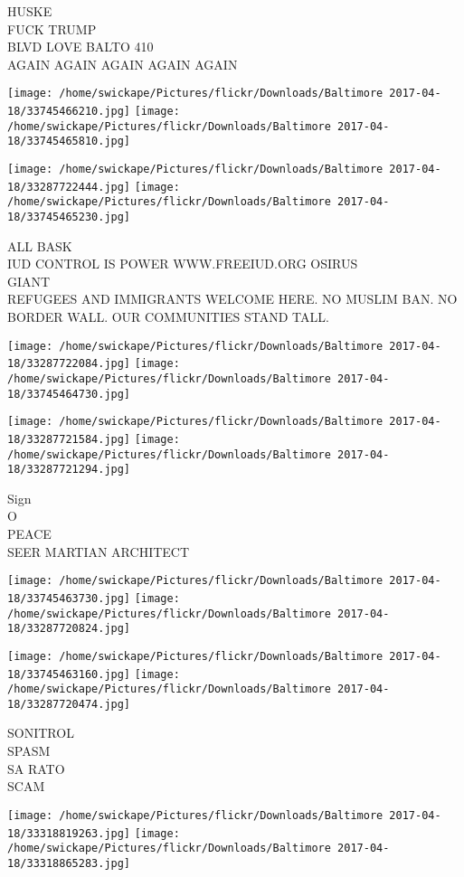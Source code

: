 \documentclass[10pt,letterpaper]{article}
\begin{document}
HUSKE\\
FUCK TRUMP\\
BLVD LOVE BALTO 410\\
AGAIN AGAIN AGAIN AGAIN AGAIN
\pagebreak

\texttt{[image: /home/swickape/Pictures/flickr/Downloads/Baltimore 2017-04-18/33745466210.jpg]}
\texttt{[image: /home/swickape/Pictures/flickr/Downloads/Baltimore 2017-04-18/33745465810.jpg]}

\texttt{[image: /home/swickape/Pictures/flickr/Downloads/Baltimore 2017-04-18/33287722444.jpg]}
\texttt{[image: /home/swickape/Pictures/flickr/Downloads/Baltimore 2017-04-18/33745465230.jpg]}

ALL BASK\\
IUD CONTROL IS POWER WWW.FREEIUD.ORG OSIRUS\\
GIANT\\
REFUGEES AND IMMIGRANTS WELCOME HERE.  NO MUSLIM BAN.  NO BORDER WALL.  OUR COMMUNITIES STAND TALL.
\pagebreak

\texttt{[image: /home/swickape/Pictures/flickr/Downloads/Baltimore 2017-04-18/33287722084.jpg]}
\texttt{[image: /home/swickape/Pictures/flickr/Downloads/Baltimore 2017-04-18/33745464730.jpg]}

\texttt{[image: /home/swickape/Pictures/flickr/Downloads/Baltimore 2017-04-18/33287721584.jpg]}
\texttt{[image: /home/swickape/Pictures/flickr/Downloads/Baltimore 2017-04-18/33287721294.jpg]}

Sign\\
O\\
PEACE\\
SEER MARTIAN ARCHITECT
\pagebreak

\texttt{[image: /home/swickape/Pictures/flickr/Downloads/Baltimore 2017-04-18/33745463730.jpg]}
\texttt{[image: /home/swickape/Pictures/flickr/Downloads/Baltimore 2017-04-18/33287720824.jpg]}

\texttt{[image: /home/swickape/Pictures/flickr/Downloads/Baltimore 2017-04-18/33745463160.jpg]}
\texttt{[image: /home/swickape/Pictures/flickr/Downloads/Baltimore 2017-04-18/33287720474.jpg]}

SONITROL\\
SPASM\\
SA RATO\\
SCAM
\pagebreak

\texttt{[image: /home/swickape/Pictures/flickr/Downloads/Baltimore 2017-04-18/33318819263.jpg]}
\texttt{[image: /home/swickape/Pictures/flickr/Downloads/Baltimore 2017-04-18/33318865283.jpg]}
\end{document}

